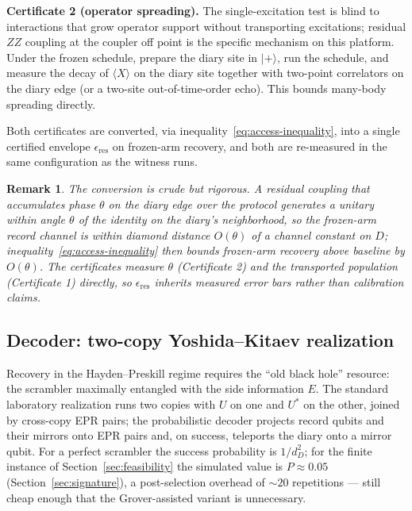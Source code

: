 \documentclass[11pt]{article}
\newtheorem{remark}{Remark}
\begin{document}
\textbf{Certificate 2 (operator spreading).}  The single-excitation
test is blind to interactions that grow operator support without
transporting excitations; residual $ZZ$ coupling at the coupler off
point is the specific mechanism on this platform.  Under the frozen
schedule, prepare the diary site in $|+\rangle$, run the schedule,
and measure the decay of $\langle X\rangle$ on the diary site
together with two-point correlators on the diary edge (or a two-site
out-of-time-order echo).  This bounds many-body spreading directly.

Both certificates are converted, via
inequality~\eqref{eq:access-inequality}, into a single certified
envelope $\epsilon_{\mathrm{res}}$ on frozen-arm recovery, and both
are re-measured in the same configuration as the witness runs.

\begin{remark}
The conversion is crude but rigorous.  A residual coupling that
accumulates phase $\theta$ on the diary edge over the protocol
generates a unitary within angle $\theta$ of the identity on the
diary's neighborhood, so the frozen-arm record channel is within
diamond distance $O(\theta)$ of a channel constant on $D$;
inequality~\eqref{eq:access-inequality} then bounds frozen-arm
recovery above baseline by $O(\theta)$.  The certificates measure
$\theta$ (Certificate 2) and the transported population
(Certificate 1) directly, so $\epsilon_{\mathrm{res}}$ inherits
measured error bars rather than calibration claims.
\end{remark}

\subsection{Decoder: two-copy Yoshida--Kitaev realization}
\label{sec:conjugate}

Recovery in the Hayden--Preskill regime requires the ``old black
hole'' resource: the scrambler maximally entangled with the side
information $E$.  The standard laboratory realization
\citep{YoshidaKitaev2017,Landsman2019,Blok2021} runs two copies with
$U$ on one and $U^*$ on the other, joined by cross-copy EPR pairs;
the probabilistic decoder projects record qubits and their mirrors
onto EPR pairs and, on success, teleports the diary onto a mirror
qubit.  For a perfect scrambler the success probability is
$1/d_D^2$; for the finite instance of Section~\ref{sec:feasibility}
the simulated value is $P \approx 0.05$
(Section~\ref{sec:signature}), a post-selection overhead of
$\sim 20$ repetitions --- still cheap enough that the
Grover-assisted variant is unnecessary.
\end{document}
